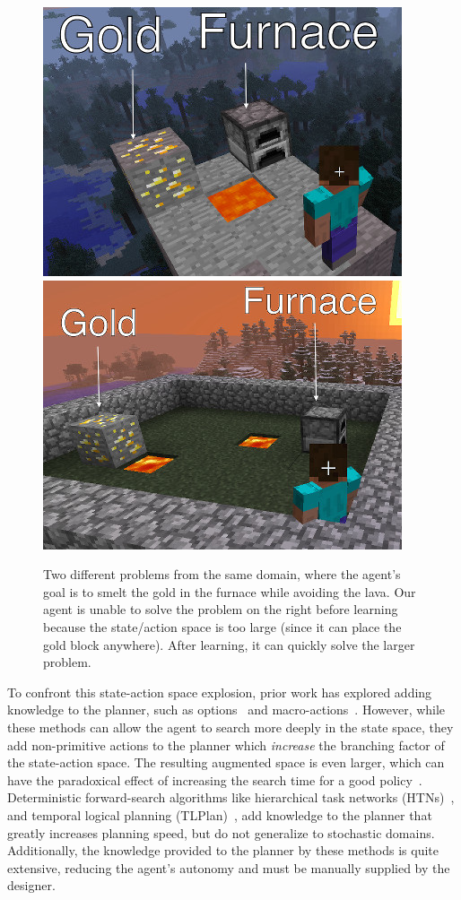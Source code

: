 \documentclass[letterpaper]{article}
\begin{document}
\begin{figure}
\centering
\includegraphics[width=0.49\linewidth]{figures/smelt_small.jpg}
\includegraphics[width=0.49\linewidth]{figures/smelt_large.jpg}
\caption{Two different problems from the same domain, where the
  agent's goal is to smelt the gold in the furnace while avoiding the
  lava.  Our agent is unable to solve the problem on the right before
  learning because the state/action space is too large (since it can
  place the gold block anywhere).  After learning, it can quickly
  solve the larger problem.\label{fig:example}}
\end{figure}


To confront this state-action space explosion, prior work has explored
adding knowledge to the planner, such as options~\cite{sutton99} and
macro-actions~\cite{Botea:2005kx,Newton:2005vn}.  However, while these
methods can allow the agent to search more deeply in the state space,
they add non-primitive actions to the planner which {\em increase} the
branching factor of the state-action space.  The resulting augmented
space is even larger, which can have the paradoxical effect of
increasing the search time for a good policy~\cite{Jong:2008zr}.
Deterministic forward-search algorithms like hierarchical task
networks (HTNs)~\citep{Nau:1999:SSH:1624312.1624357}, and temporal
logical planning
(TLPlan)~\citep{Bacchus95usingtemporal,Bacchus99usingtemporal}, add
knowledge to the planner that greatly increases planning speed, but do
not generalize to stochastic domains. Additionally, the knowledge
provided to the planner by these methods is quite extensive, reducing
the agent's autonomy and must be manually supplied by the designer.
\end{document}
